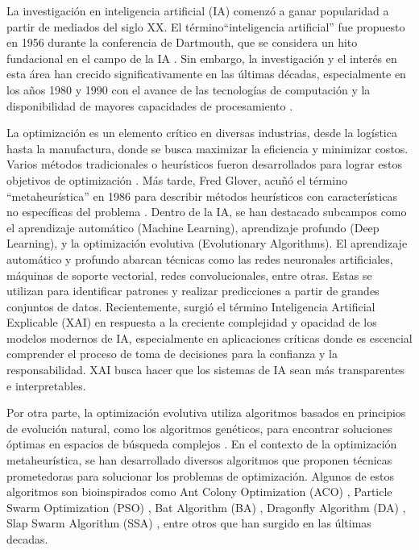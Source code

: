 
La investigación en inteligencia artificial (IA) comenzó a ganar popularidad a partir de mediados del siglo XX. El término``inteligencia artificial'' fue propuesto en 1956 durante la conferencia de Dartmouth, que se considera un hito fundacional en el campo de la IA \cite{McCarthy_Minsky_Rochester_Shannon_2006}. Sin embargo, la investigación y el interés en esta área han crecido significativamente en las últimas décadas, especialmente en los años 1980 y 1990 con el avance de las tecnologías de computación y la disponibilidad de mayores capacidades de procesamiento \cite{aiindex2023, LeCun2015}.

La optimización es un elemento crítico en diversas industrias, desde la logística hasta la manufactura, donde se busca maximizar la eficiencia y minimizar costos. Varios métodos tradicionales o heurísticos fueron desarrollados para lograr estos objetivos de optimización \cite{CHEN201771, bard1990branch, vince2002framework}. Más tarde, Fred Glover, acuñó el término ``metaheurística'' en 1986 \cite{glover1986future} para describir métodos heurísticos con características no específicas del problema \cite{abdel2018metaheuristic}. Dentro de la IA, se han destacado subcampos como el aprendizaje automático (Machine Learning), aprendizaje profundo (Deep Learning), y la optimización evolutiva (Evolutionary Algorithms). El aprendizaje automático y profundo abarcan técnicas como las redes neuronales artificiales, máquinas de soporte vectorial, redes convolucionales, entre otras. Estas se utilizan para identificar patrones y realizar predicciones a partir de grandes conjuntos de datos. Recientemente, surgió el término Inteligencia Artificial Explicable (XAI) en respuesta a la creciente complejidad y opacidad de los modelos modernos de IA, especialmente en aplicaciones críticas donde es escencial comprender el proceso de toma de decisiones para la confianza y la responsabilidad. XAI busca hacer que los sistemas de IA sean más transparentes e interpretables.

Por otra parte, la optimización evolutiva utiliza algoritmos basados en principios de evolución natural, como los algoritmos genéticos, para encontrar soluciones óptimas en espacios de búsqueda complejos \cite{izzo2019survey}. En el  contexto de la optimización metaheurística, se han desarrollado diversos algoritmos que proponen técnicas prometedoras para solucionar los problemas de optimización. Algunos de estos algoritmos son bioinspirados como  Ant Colony Optimization (ACO) \cite{484436}, Particle Swarm Optimization (PSO) \cite{488968}, Bat Algorithm (BA) \cite{bat-algorithm}, Dragonfly Algorithm (DA) \cite{Meraihi2020}, Slap Swarm Algorithm (SSA) \cite{MIRJALILI2017163}, entre otros que han surgido en las últimas decadas.

